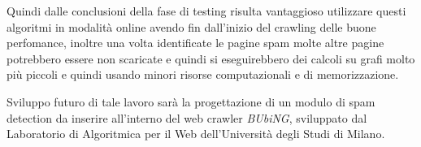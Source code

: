 Quindi dalle conclusioni della fase di testing risulta vantaggioso utilizzare questi algoritmi in modalità online avendo fin dall'inizio del crawling delle buone perfomance, inoltre una volta identificate le pagine spam molte altre pagine potrebbero essere non scaricate e quindi si eseguirebbero dei calcoli su grafi molto più piccoli e quindi usando minori risorse computazionali e di memorizzazione.

Sviluppo futuro di tale lavoro sarà la progettazione di un modulo di spam detection da inserire all'interno del  web crawler \textit{BUbiNG}, sviluppato dal Laboratorio di Algoritmica per il Web dell'Università degli Studi di Milano.


